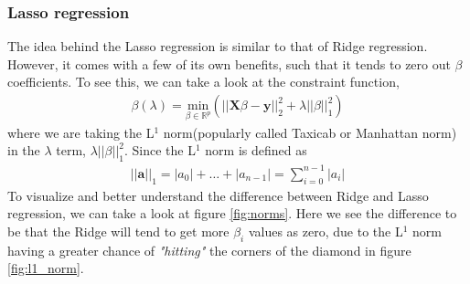 \documentclass[11pt]{article}
\begin{document}
\subsubsection{Lasso regression}
The idea behind the Lasso regression is similar to that of Ridge regression. However, it comes with a few of its own benefits, such that it tends to zero out $\beta$ coefficients. To see this, we can take a look at the constraint function,
\begin{align}
    \beta(\lambda) = \underset{\beta\in \mathbb{R}^{p}}{\text{min}}(||\bm{X}\beta - \bm{y}||^2_2 + \lambda||\beta||^2_1)
    \label{eq:lasso_constraint}
\end{align}
where we are taking the L$^1$ norm(popularly called Taxicab or Manhattan norm) in the $\lambda$ term, $\lambda||\beta||^2_1$. Since the L$^1$ norm is defined as
\begin{align*}
    ||\bm{a}||_1 = |a_0| + \dots + |a_{n-1}| = \sum^{n-1}_{i=0}|a_i|
\end{align*}
To visualize and better understand the difference between Ridge and Lasso regression, we can take a look at figure \ref{fig:norms}. Here we see the difference to be that the Ridge will tend to get more $\beta_i$ values as zero, due to the L$^1$ norm having a greater chance of \textit{"hitting"} the corners of the diamond in figure \ref{fig:l1_norm}.
\end{document}
